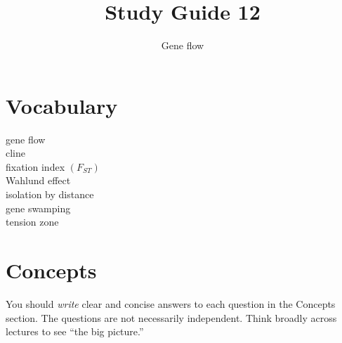 \documentclass[letterpaper]{tufte-handout}
\title{Study Guide 12\hfill}
\author{Gene flow}
\date{} %
\begin{document}
\maketitle	%

\section{Vocabulary}

\begin{multicols}{2}
gene flow \\
cline \\
fixation index $(F_{ST})$ \\
Wahlund effect \\
isolation by distance \\
gene swamping \\
tension zone
\end{multicols}


\section{Concepts}

You should \emph{write} clear and concise answers to each question in the Concepts section.  The questions are not necessarily independent.  Think broadly across lectures to see ``the big picture.'' 
\end{document}
